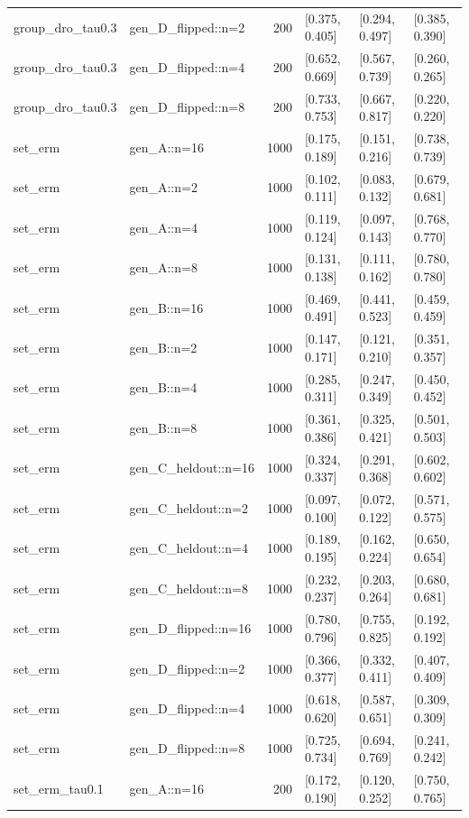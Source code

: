 \begin{tabular}{llrlll}
group\_dro\_tau0.3 & gen\_D\_flipped::n=2 & 200 & [0.375, 0.405] & [0.294, 0.497] & [0.385, 0.390] \\
group\_dro\_tau0.3 & gen\_D\_flipped::n=4 & 200 & [0.652, 0.669] & [0.567, 0.739] & [0.260, 0.265] \\
group\_dro\_tau0.3 & gen\_D\_flipped::n=8 & 200 & [0.733, 0.753] & [0.667, 0.817] & [0.220, 0.220] \\
set\_erm & gen\_A::n=16 & 1000 & [0.175, 0.189] & [0.151, 0.216] & [0.738, 0.739] \\
set\_erm & gen\_A::n=2 & 1000 & [0.102, 0.111] & [0.083, 0.132] & [0.679, 0.681] \\
set\_erm & gen\_A::n=4 & 1000 & [0.119, 0.124] & [0.097, 0.143] & [0.768, 0.770] \\
set\_erm & gen\_A::n=8 & 1000 & [0.131, 0.138] & [0.111, 0.162] & [0.780, 0.780] \\
set\_erm & gen\_B::n=16 & 1000 & [0.469, 0.491] & [0.441, 0.523] & [0.459, 0.459] \\
set\_erm & gen\_B::n=2 & 1000 & [0.147, 0.171] & [0.121, 0.210] & [0.351, 0.357] \\
set\_erm & gen\_B::n=4 & 1000 & [0.285, 0.311] & [0.247, 0.349] & [0.450, 0.452] \\
set\_erm & gen\_B::n=8 & 1000 & [0.361, 0.386] & [0.325, 0.421] & [0.501, 0.503] \\
set\_erm & gen\_C\_heldout::n=16 & 1000 & [0.324, 0.337] & [0.291, 0.368] & [0.602, 0.602] \\
set\_erm & gen\_C\_heldout::n=2 & 1000 & [0.097, 0.100] & [0.072, 0.122] & [0.571, 0.575] \\
set\_erm & gen\_C\_heldout::n=4 & 1000 & [0.189, 0.195] & [0.162, 0.224] & [0.650, 0.654] \\
set\_erm & gen\_C\_heldout::n=8 & 1000 & [0.232, 0.237] & [0.203, 0.264] & [0.680, 0.681] \\
set\_erm & gen\_D\_flipped::n=16 & 1000 & [0.780, 0.796] & [0.755, 0.825] & [0.192, 0.192] \\
set\_erm & gen\_D\_flipped::n=2 & 1000 & [0.366, 0.377] & [0.332, 0.411] & [0.407, 0.409] \\
set\_erm & gen\_D\_flipped::n=4 & 1000 & [0.618, 0.620] & [0.587, 0.651] & [0.309, 0.309] \\
set\_erm & gen\_D\_flipped::n=8 & 1000 & [0.725, 0.734] & [0.694, 0.769] & [0.241, 0.242] \\
set\_erm\_tau0.1 & gen\_A::n=16 & 200 & [0.172, 0.190] & [0.120, 0.252] & [0.750, 0.765] \\

\end{tabular}
